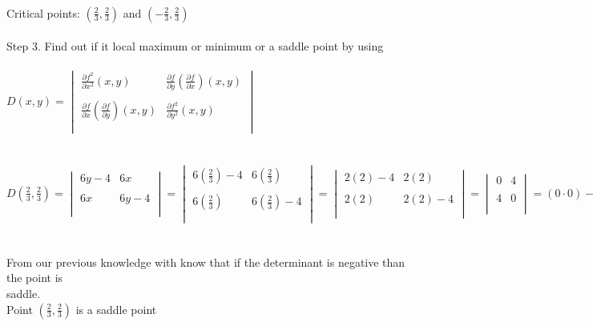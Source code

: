 \documentclass{article}
\begin{document}
\begin{enumerate}[14.]
	\\
	Critical points: $(\frac{2}{3},\frac{2}{3})$ and $(-\frac{2}{3},\frac{2}{3})$
	\\
	\\
	Step 3. Find out if it local maximum or minimum or a saddle point by using \\\\ $D(x,y)= \begin{vmatrix}
	\frac{\partial{f^{2}}}{\partial{x^{2}}}(x,y)&\frac{\partial{f}}{\partial{y}}(\frac{\partial{f}}{\partial{x}})(x,y)\\\\
	\frac{\partial{f}}{\partial{x}}(\frac{\partial{f}}{\partial{y}})(x,y)&\frac{\partial{f^{2}}}{\partial{y^{2}}}(x,y)\\\\
	\end{vmatrix}$\\
	\\
	\\
	$D(\frac{2}{3},\frac{2}{3})= \begin{vmatrix}
	6y-4&6x\\\\
	6x&6y-4\\\\
	\end{vmatrix}=\begin{vmatrix}
	6(\frac{2}{3})-4&6(\frac{2}{3})\\\\
	6(\frac{2}{3})&6(\frac{2}{3})-4\\\\
	\end{vmatrix}=\begin{vmatrix}
	2(2)-4&2(2)\\\\
	2(2)&2(2)-4\\\\
	\end{vmatrix}=\begin{vmatrix}
	0&4\\\\
	4&0\\\\
	\end{vmatrix}=(0\cdot0)-(4\cdot4)=0-16=-16$
	\\
	\\
	\\
	From our previous knowledge with know that if the determinant is negative than the point is\\
	saddle. 
	\\Point $(\frac{2}{3},\frac{2}{3})$ is a saddle point\\

\end{enumerate}
\end{document}
